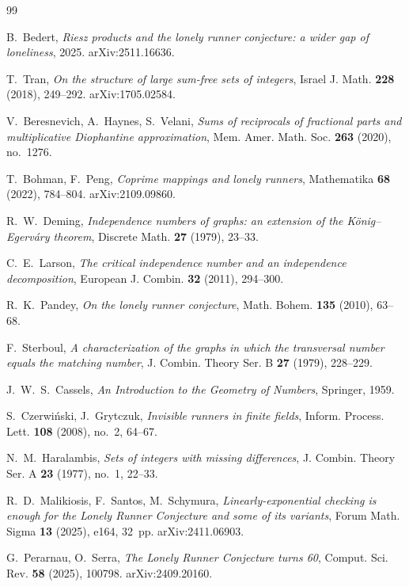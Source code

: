\documentclass[11pt]{amsart}
\theoremstyle{plain}
\theoremstyle{definition}
\begin{document}
\begin{thebibliography}{99}

 B.~Bedert, \emph{Riesz products and the lonely runner conjecture: a wider gap of
loneliness}, 2025. arXiv:2511.16636.

 T.~Tran, \emph{On the structure of large sum-free sets of integers}, Israel J.
Math. \textbf{228} (2018), 249--292. arXiv:1705.02584.

 V.~Beresnevich, A.~Haynes, S.~Velani, \emph{Sums of reciprocals of fractional parts
and multiplicative Diophantine approximation}, Mem. Amer. Math. Soc. \textbf{263} (2020), no.~1276.

 T.~Bohman, F.~Peng, \emph{Coprime mappings and lonely runners}, Mathematika
\textbf{68} (2022), 784--804. arXiv:2109.09860.

 R.~W.~Deming, \emph{Independence numbers of graphs: an extension of the
K\"onig--Egerv\'ary theorem}, Discrete Math. \textbf{27} (1979), 23--33.

 C.~E.~Larson, \emph{The critical independence number and an independence
decomposition}, European J. Combin. \textbf{32} (2011), 294--300.

 R.~K.~Pandey, \emph{On the lonely runner conjecture}, Math. Bohem. \textbf{135}
(2010), 63--68.

 F.~Sterboul, \emph{A characterization of the graphs in which the transversal number
equals the matching number}, J. Combin. Theory Ser. B \textbf{27} (1979), 228--229.

 J.~W.~S.~Cassels, \emph{An Introduction to the Geometry of Numbers}, Springer,
1959.

 S.~Czerwi\'nski, J.~Grytczuk, \emph{Invisible runners in finite fields},
Inform. Process. Lett. \textbf{108} (2008), no.~2, 64--67.

 N.~M.~Haralambis, \emph{Sets of integers with missing differences},
J. Combin. Theory Ser. A \textbf{23} (1977), no.~1, 22--33.

 R.~D.~Malikiosis, F.~Santos, M.~Schymura, \emph{Linearly-exponential checking is
enough for the Lonely Runner Conjecture and some of its variants}, Forum Math. Sigma \textbf{13}
(2025), e164, 32~pp. arXiv:2411.06903.

 G.~Perarnau, O.~Serra, \emph{The Lonely Runner Conjecture turns 60},
Comput. Sci. Rev. \textbf{58} (2025), 100798. arXiv:2409.20160.


\end{thebibliography}
\end{document}
